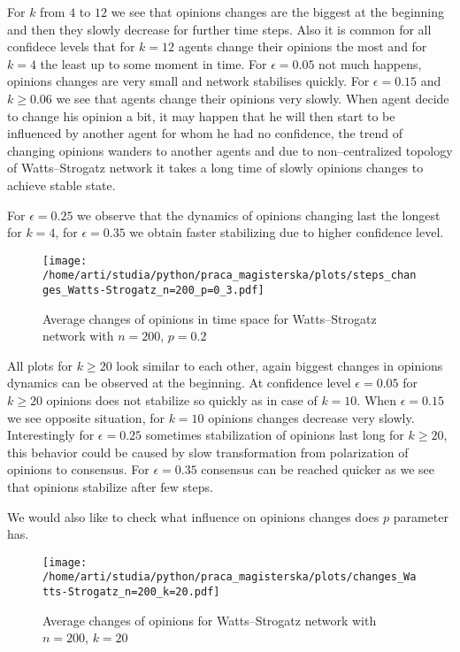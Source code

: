 \documentclass{article}
\begin{document}
For $k$ from $4$ to $12$ we see that opinions changes are the biggest at the beginning and then they slowly decrease for further time steps. Also it is common for all confidece levels that for $k=12$ agents change their opinions the most and for $k=4$ the least up to some moment in time. For $\epsilon=0.05$ not much happens, opinions changes are very small and network stabilises quickly. For $\epsilon=0.15$ and $k \geq 0.06$ we see that agents change their opinions very slowly. When agent decide to change his opinion a bit, it may happen that he will then start to be influenced by another agent for whom he had no confidence, the trend of changing opinions wanders to another agents and due to non--centralized topology of Watts--Strogatz network it takes a long time of slowly opinions changes to achieve stable state.
\indent

For $\epsilon=0.25$ we observe that the dynamics of opinions changing last the longest for $k=4$, for $\epsilon=0.35$ we obtain faster stabilizing due to higher confidence level.

\begin{figure}[H]
		\centering
		\texttt{[image: /home/arti/studia/python/praca\_magisterska/plots/steps\_changes\_Watts-Strogatz\_n=200\_p=0\_3.pdf]}
		\caption{Average changes of opinions in time space for Watts--Strogatz network with $n=200$, $p=0.2$}
\end{figure}

All plots for $k \geq 20$ look similar to each other, again biggest changes in opinions dynamics can be observed at the beginning. At confidence level $\epsilon=0.05$ for $k \geq 20$ opinions does not stabilize so quickly as in case of $k=10$. When $\epsilon=0.15$ we see opposite situation, for $k=10$ opinions changes decrease very slowly. Interestingly for $\epsilon=0.25$ sometimes stabilization of opinions last long for $k \geq 20$, this behavior could be caused by slow transformation from polarization of opinions to consensus. For $\epsilon=0.35$ consensus can be reached quicker as we see that opinions stabilize after few steps.

\indent

We would also like to check what influence on opinions changes does $p$ parameter has.

\begin{figure}[H]
		\centering
		\texttt{[image: /home/arti/studia/python/praca\_magisterska/plots/changes\_Watts-Strogatz\_n=200\_k=20.pdf]}
		\caption{Average changes of opinions for Watts--Strogatz network with $n=200$, $k=20$}
\end{figure}
\end{document}
